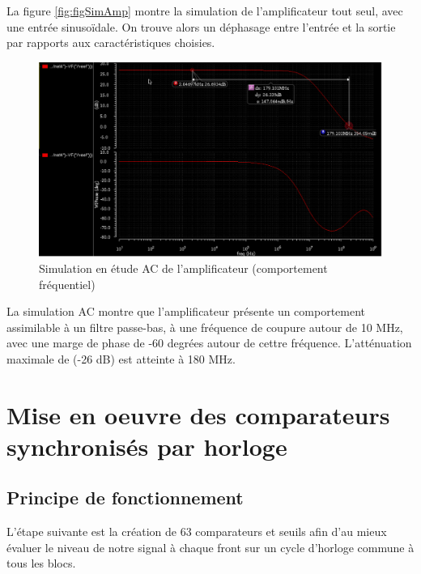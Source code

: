 \documentclass[11pt]{article}
\begin{document}
La figure \ref{fig:figSimAmp} montre la simulation de l'amplificateur tout seul, avec une entr\'ee
sinuso\"idale. On trouve alors un d\'ephasage entre l'entr\'ee et la sortie par rapports aux
caract\'eristiques choisies.

\begin{figure}[!htb]
\begin{center}
  \includegraphics[width=0.85\linewidth]{sim_EB_freq.png}
  \caption{Simulation en \'etude AC  de l'amplificateur (comportement fr\'equentiel)}
  \label{fig:figSimAmpAC}
\end{center}
\end{figure}

La simulation AC montre que l'amplificateur pr\'esente un comportement assimilable \`a un filtre passe-bas, \`a une fr\'equence de coupure autour de 10 MHz, avec une marge de phase de -60 degr\'ees autour de cettre fr\'equence. L'att\'enuation maximale de (-26 dB) est atteinte \`a 180 MHz.

\clearpage

\section{Mise en oeuvre des comparateurs synchronis\'es par horloge}
\subsection{Principe de fonctionnement}
L'\'etape suivante est la cr\'eation de 63 comparateurs et seuils afin d'au mieux \'evaluer le niveau de
notre signal \`a chaque front sur un cycle d'horloge commune \`a tous les blocs.
\end{document}

